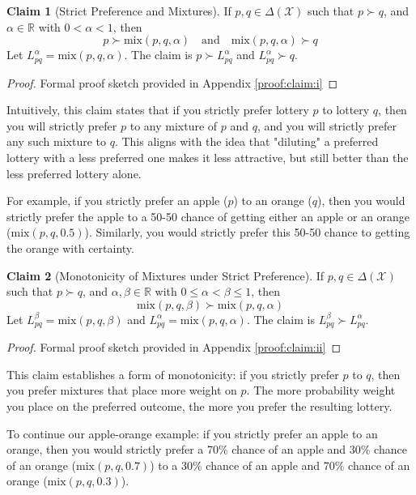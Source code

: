\documentclass{article}
\theoremstyle{definition}
\newtheorem{claim}{Claim}[section] %
\newcommand{\R}{\mathbb{R}}
\newcommand{\X}{\mathcal{X}}
\newcommand{\DeltaX}{\Delta(\X)} %
\newcommand{\strictpref}{\succ} %
\newcommand{\mix}{\mathrm{mix}} %
\begin{document}
\begin{claim}[Strict Preference and Mixtures]\label{claim:i}
If $p, q \in \DeltaX$ such that $p \strictpref q$, and $\alpha \in \R$ with $0 < \alpha < 1$, then
\[ p \strictpref \mix(p, q, \alpha) \quad \text{and} \quad \mix(p, q, \alpha) \strictpref q \]
Let $L_{pq}^\alpha = \mix(p, q, \alpha)$. The claim is $p \strictpref L_{pq}^\alpha$ and $L_{pq}^\alpha \strictpref q$.
\end{claim}
\begin{proof}
Formal proof sketch provided in Appendix \ref{proof:claim:i}
\end{proof}

Intuitively, this claim states that if you strictly prefer lottery $p$ to lottery $q$, then you will strictly prefer $p$ to any mixture of $p$ and $q$, and you will strictly prefer any such mixture to $q$. This aligns with the idea that "diluting" a preferred lottery with a less preferred one makes it less attractive, but still better than the less preferred lottery alone.

For example, if you strictly prefer an apple ($p$) to an orange ($q$), then you would strictly prefer the apple to a 50-50 chance of getting either an apple or an orange ($\mix(p, q, 0.5)$). Similarly, you would strictly prefer this 50-50 chance to getting the orange with certainty.

\begin{claim}[Monotonicity of Mixtures under Strict Preference]\label{claim:ii}
If $p, q \in \DeltaX$ such that $p \strictpref q$, and $\alpha, \beta \in \R$ with $0 \le \alpha < \beta \le 1$, then
\[ \mix(p, q, \beta) \strictpref \mix(p, q, \alpha) \]
Let $L_{pq}^\beta = \mix(p, q, \beta)$ and $L_{pq}^\alpha = \mix(p, q, \alpha)$. The claim is $L_{pq}^\beta \strictpref L_{pq}^\alpha$.
\end{claim}
\begin{proof}
Formal proof sketch provided in Appendix \ref{proof:claim:ii}
\end{proof}

This claim establishes a form of monotonicity: if you strictly prefer $p$ to $q$, then you prefer mixtures that place more weight on $p$. The more probability weight you place on the preferred outcome, the more you prefer the resulting lottery.

To continue our apple-orange example: if you strictly prefer an apple to an orange, then you would strictly prefer a 70\% chance of an apple and 30\% chance of an orange ($\mix(p, q, 0.7)$) to a 30\% chance of an apple and 70\% chance of an orange ($\mix(p, q, 0.3)$).
\end{document}
